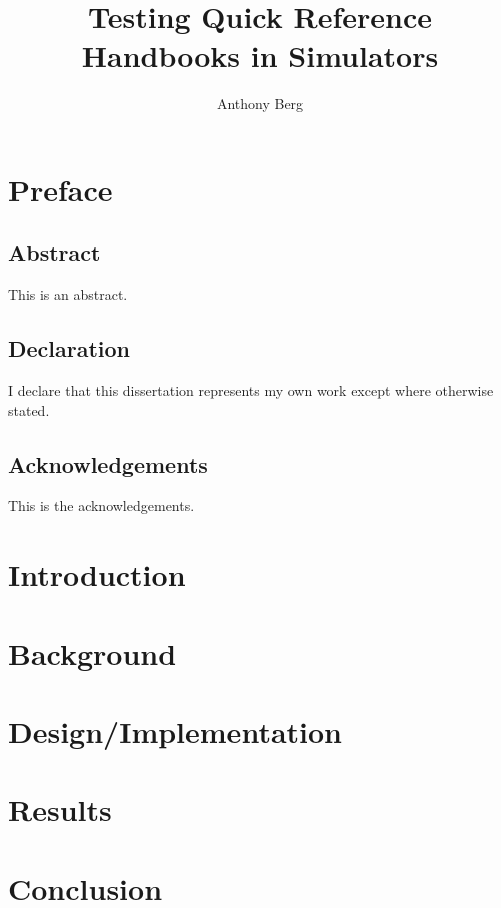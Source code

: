 \documentclass[british, twoside]{report}
\author{Anthony Berg}
\title{Testing Quick Reference Handbooks in Simulators}
\begin{document}
\maketitle

\chapter*{Preface}
\section*{Abstract}
This is an abstract.

\section*{Declaration}
I declare that this dissertation represents my own work except where otherwise stated.

\section*{Acknowledgements}
This is the acknowledgements.

\tableofcontents

\chapter{Introduction}


\chapter{Background}

\chapter{Design/Implementation}


\chapter{Results}

\chapter{Conclusion}

\nocite{*}
\printbibliography[heading=bibintoc, title={References}]
\end{document}
